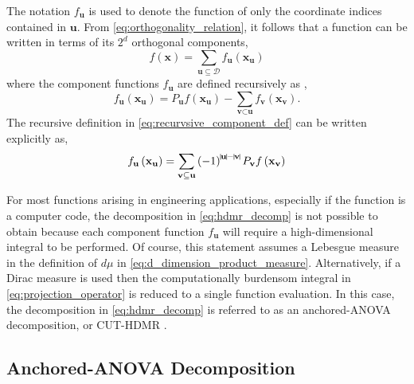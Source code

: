The notation $f_\textbf{u}$ is used to denote the function of only the coordinate indices contained in $\textbf{u}$. From \ref{eq:orthogonality_relation}, it follows that a function can be written in terms of its $2^d$ orthogonal components,
\begin{equation} \label{eq:hdmr_decomp}
    f\left(\textbf{x}\right) = 
     \sum_{\textbf{u}\subseteq\mathcal{D}}
      f_\textbf{u}\left(\textbf{x}_\textbf{u}\right)
\end{equation}
where the component functions $f_\textbf{u}$ are defined recursively as \cite{Holtz},
\begin{equation} \label{eq:recurvsive_component_def}
    f_\textbf{u}\left(\textbf{x}_\textbf{u}\right) = 
     P_\textbf{u}f\left(\textbf{x}_\textbf{u}\right) -
      \sum_{\textbf{v}\subset\textbf{u}}
       f_\textbf{v}\left(\textbf{x}_\textbf{v}\right).  
\end{equation}
The recursive definition in \ref{eq:recurvsive_component_def} can be written explicitly as,
\begin{equation} \label{eq:explicit_component_def}
    f_\textbf{u}\left(\textbf{x}_\textbf{u}\right) =
     \sum_{\textbf{v}\subseteq\textbf{u}}
      \left(-1\right)^{\vline\textbf{u}\vline-\vline\textbf{v}\vline}
       P_\textbf{v}f\left(\textbf{x}_\textbf{v}\right)    
\end{equation}

For most functions arising in engineering applications, especially if the function is a computer code, the decomposition in \ref{eq:hdmr_decomp} is not possible to obtain because each component function $f_\textbf{u}$ will require a high-dimensional integral to be performed. Of course, this statement assumes a Lebesgue measure in the definition of $d\mu$ in \ref{eq:d_dimension_product_measure}. Alternatively, if a Dirac measure is used then the computationally burdensom integral in \ref{eq:projection_operator} is reduced to a single function evaluation. In this case, the decomposition in \ref{eq:hdmr_decomp} is referred to as an anchored-\ac{ANOVA} decomposition, or CUT-\ac{HDMR} \cite{AHSGC_HighDimensions}.

\subsection{Anchored-ANOVA Decomposition} \label{subsec:anchored_anova}

